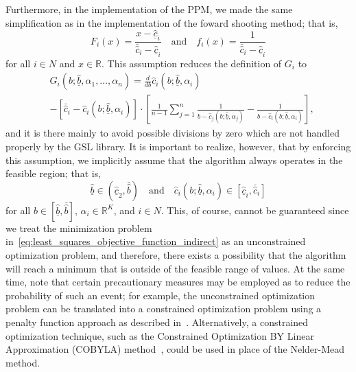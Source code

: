 Furthermore, in the implementation of the PPM, we made the same simplification as in the implementation of the foward shooting method; that is,
\begin{equation*}
  F_i(x) = \frac{x - \underline{\hat{c}}_i}{\bar{\hat{c}}_i - \underline{\hat{c}}_i} \quad\text{and}\quad f_i(x) = \frac{1}{\bar{\hat{c}}_i - \underline{\hat{c}}_i}
\end{equation*}
for all $i\in N$ and $x\in\mathbb{R}$. This assumption reduces the definition of $G_i$ to
\begin{align*}
  &G_i(b; \underline{\hat{b}}, \alpha_1, \dotsc, \alpha_n) = \displaystyle\frac{d}{db}\hat{c}_i(b;\underline{\hat{b}}, \alpha_i)\\
  &- \displaystyle\left[ \bar{\hat{c}}_i - \hat{c}_i(b;\underline{\hat{b}}, \alpha_i)\right]\cdot\left[ \frac{1}{n-1}\sum_{j=1}^n\frac{1}{b - \hat{c}_j(b;\underline{\hat{b}}, \alpha_j)} - \frac{1}{b - \hat{c}_i(b;\underline{\hat{b}}, \alpha_i)} \right],
\end{align*}
and it is there mainly to avoid possible divisions by zero which are not handled properly by the GSL library. It is important to realize, however, that by enforcing this assumption, we implicitly assume that the algorithm always operates in the feasible region; that is,
\begin{equation*}
  \underline{\hat{b}}\in (\underline{\hat{c}}_2, \bar{\hat{b}}) \quad\text{and}\quad \hat{c}_i(b;\underline{\hat{b}}, \alpha_i)\in [\underline{\hat{c}}_i, \bar{\hat{c}}_i]
\end{equation*}
for all $b\in [\underline{\hat{b}}, \bar{\hat{b}}]$, $\alpha_i\in\mathbb{R}^K$, and $i\in N$. This, of course, cannot be guaranteed since we treat the minimization problem in~\eqref{eq:least_squares_objective_function_indirect} as an unconstrained optimization problem, and therefore, there exists a possibility that the algorithm will reach a minimum that is outside of the feasible range of values. At the same time, note that certain precautionary measures may be employed as to reduce the probability of such an event; for example, the unconstrained optimization problem can be translated into a constrained optimization problem using a penalty function approach as described in~\cite{AvrielPenalty2003}. Alternatively, a constrained optimization technique, such as the Constrained Optimization BY Linear Approximation (COBYLA) method~\cite{Powell1994}, could be used in place of the Nelder-Mead method.

